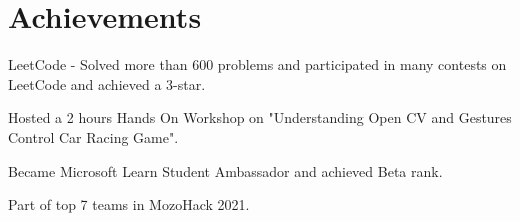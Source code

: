 \documentclass[]{deedy-resume-openfont}
\begin{document}
\begin{minipage}[t]{0.43\textwidth}
\vspace{5pt}
\section{Achievements} 
\vspace{\topsep}
\begin{tightemize}
\item LeetCode - Solved more than 600 problems and participated in many contests on LeetCode and achieved a 3-star.\\
\item Hosted a 2 hours Hands On Workshop on "Understanding Open CV and Gestures Control Car Racing Game".\\
\item Became Microsoft Learn Student Ambassador and achieved Beta rank.\\
\item Part of top 7 teams in MozoHack 2021.
\end{tightemize}
\sectionsep

%
%

\end{minipage} 
\hfill
\end{document}
